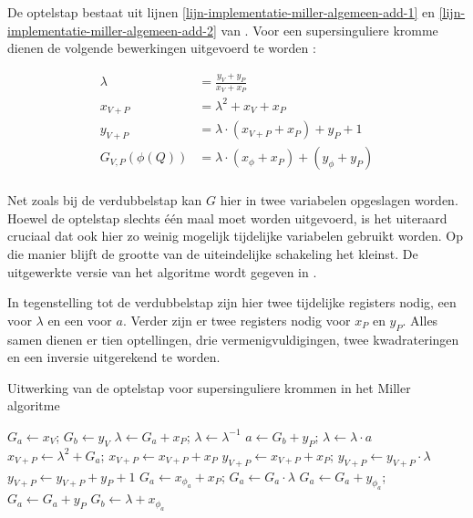 De optelstap bestaat uit lijnen \ref{lijn-implementatie-miller-algemeen-add-1} en \ref{lijn-implementatie-miller-algemeen-add-2} van . Voor een supersinguliere kromme dienen de volgende bewerkingen uitgevoerd te worden \cite{bertoni, hankerson-book}:

\[\begin{aligned}
	\lambda &= \frac{y_V + y_P}{x_V + x_P}\\
	x_{V + P} &= \lambda ^2 + x_V + x_P\\
	y_{V + P} &= \lambda \cdot (x_{V + P} + x_P) + y_P + 1\\
	G_{V,P}(\phi(Q)) &= \lambda \cdot (x_{\phi} + x_P) + (y_{\phi} + y_P)\\
\end{aligned}\]

Net zoals bij de verdubbelstap kan $G$ hier in twee variabelen opgeslagen worden. Hoewel de optelstap slechts \'e\'en maal moet worden uitgevoerd, is het uiteraard cruciaal dat ook hier zo weinig mogelijk tijdelijke variabelen gebruikt worden. Op die manier blijft de grootte van de uiteindelijke schakeling het kleinst. De uitgewerkte versie van het algoritme wordt gegeven in .

In tegenstelling tot de verdubbelstap zijn hier twee tijdelijke registers nodig, een voor $\lambda$ en een voor $a$. Verder zijn er twee registers nodig voor $x_P$ en $y_P$. Alles samen dienen er tien optellingen, drie vermenigvuldigingen, twee kwadrateringen en een inversie uitgerekend te worden.

\begin{algorithm}[h]
	\caption{Uitwerking van de optelstap voor supersinguliere krommen in het Miller algoritme}
	\label{algoritme-implementatie-miller-add-detail}
	$G_a \leftarrow x_V$; $G_b \leftarrow y_V$\;
	$\lambda \leftarrow G_a + x_P$; $\lambda \leftarrow \lambda^{-1}$\;
	$a \leftarrow G_b + y_P$; $\lambda \leftarrow \lambda \cdot a$\;
	$x_{V + P} \leftarrow \lambda ^2 + G_a$; $x_{V + P} \leftarrow x_{V + P} + x_P$\;
	$y_{V + P} \leftarrow x_{V + P} + x_P$; $y_{V + P} \leftarrow y_{V + P} \cdot \lambda$\;
	$y_{V + P} \leftarrow y_{V + P} + y_P + 1$\;
	$G_a \leftarrow x_{\phi_a} + x_P$; $G_a \leftarrow G_a \cdot \lambda$\;
	$G_a \leftarrow G_a + y_{\phi_a}$; $G_a \leftarrow G_a + y_P$\;
	$G_b \leftarrow \lambda + x_{\phi_a}$\;
\end{algorithm}

